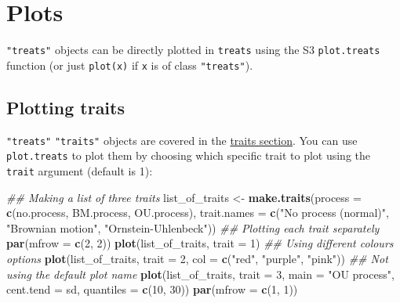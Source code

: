 \documentclass[
]{book}
\newenvironment{Shaded}{\begin{snugshade}}{\end{snugshade}}
\newcommand{\CommentTok}[1]{\textcolor[rgb]{0.56,0.35,0.01}{\textit{#1}}}
\newcommand{\DataTypeTok}[1]{\textcolor[rgb]{0.13,0.29,0.53}{#1}}
\newcommand{\DecValTok}[1]{\textcolor[rgb]{0.00,0.00,0.81}{#1}}
\newcommand{\KeywordTok}[1]{\textcolor[rgb]{0.13,0.29,0.53}{\textbf{#1}}}
\newcommand{\NormalTok}[1]{#1}
\newcommand{\StringTok}[1]{\textcolor[rgb]{0.31,0.60,0.02}{#1}}
\begin{document}
\hypertarget{plots}{%
\chapter{Plots}\label{plots}}

\texttt{"treats"} objects can be directly plotted in \texttt{treats} using the S3 \texttt{plot.treats} function (or just \texttt{plot(x)} if \texttt{x} is of class \texttt{"treats"}).

\hypertarget{plotting-traits}{%
\section{Plotting traits}\label{plotting-traits}}

\texttt{"treats"} \texttt{"traits"} objects are covered in the \protect\hyperlink{maketraits}{traits section}.
You can use \texttt{plot.treats} to plot them by choosing which specific trait to plot using the \texttt{trait} argument (default is 1):

\begin{Shaded}
\begin{Highlighting}[]
\CommentTok{\#\# Making a list of three traits}
\NormalTok{list\_of\_traits \textless{}{-}}\StringTok{ }\KeywordTok{make.traits}\NormalTok{(}\DataTypeTok{process =} \KeywordTok{c}\NormalTok{(no.process, BM.process, OU.process), }\DataTypeTok{trait.names =} \KeywordTok{c}\NormalTok{(}\StringTok{"No process (normal)"}\NormalTok{, }\StringTok{"Brownian motion"}\NormalTok{, }\StringTok{"Ornstein{-}Uhlenbeck"}\NormalTok{))}
\CommentTok{\#\# Plotting each trait separately}
\KeywordTok{par}\NormalTok{(}\DataTypeTok{mfrow =} \KeywordTok{c}\NormalTok{(}\DecValTok{2}\NormalTok{, }\DecValTok{2}\NormalTok{))}
\KeywordTok{plot}\NormalTok{(list\_of\_traits, }\DataTypeTok{trait =} \DecValTok{1}\NormalTok{)}
\CommentTok{\#\# Using different colours options}
\KeywordTok{plot}\NormalTok{(list\_of\_traits, }\DataTypeTok{trait =} \DecValTok{2}\NormalTok{, }\DataTypeTok{col =} \KeywordTok{c}\NormalTok{(}\StringTok{"red"}\NormalTok{, }\StringTok{"purple"}\NormalTok{, }\StringTok{"pink"}\NormalTok{))}
\CommentTok{\#\# Not using the default plot name}
\KeywordTok{plot}\NormalTok{(list\_of\_traits, }\DataTypeTok{trait =} \DecValTok{3}\NormalTok{, }\DataTypeTok{main =} \StringTok{"OU process"}\NormalTok{,}
     \DataTypeTok{cent.tend =}\NormalTok{ sd, }\DataTypeTok{quantiles =} \KeywordTok{c}\NormalTok{(}\DecValTok{10}\NormalTok{, }\DecValTok{30}\NormalTok{))}
\KeywordTok{par}\NormalTok{(}\DataTypeTok{mfrow =} \KeywordTok{c}\NormalTok{(}\DecValTok{1}\NormalTok{, }\DecValTok{1}\NormalTok{))}
\end{Highlighting}
\end{Shaded}
\end{document}

